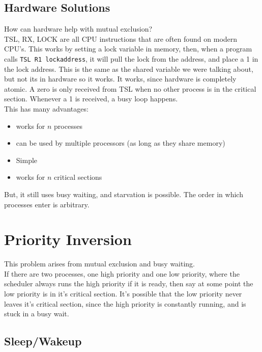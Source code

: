 \documentclass[12pt]{article}
\theoremstyle{definition}
\begin{document}
\subsection{Hardware Solutions}
How can hardware help with mutual exclusion?
\\ \linebreak
TSL, RX, LOCK are all CPU instructions that are often found on modern CPU's. This works by setting a lock variable in memory, then, when a program calls \texttt{TSL R1 lockaddress}, it will pull the lock from the address, and place a 1 in the lock address. This is the same as the shared variable we were talking about, but not its in hardware so it works. It works, since hardware is completely atomic. A zero is only received from TSL when no other process is in the critical section. Whenever a 1 is received, a busy loop happens.
\\ \linebreak
This has many advantages:
\begin{itemize}
	\item works for $n$ processes
	\item can be used by multiple processors (as long as they share memory)
	\item Simple
	\item works for $n$ critical sections
\end{itemize}
But, it still uses busy waiting, and starvation is possible. The order in which processes enter is arbitrary.
\\ \linebreak

\section{Priority Inversion}
This problem arises from mutual exclusion and busy waiting. 
\\ \linebreak
If there are two processes, one high priority and one low priority, where the scheduler always runs the high priority if it is ready, then say at some point the low priority is in it's critical section. It's possible that the low priority never leaves it's critical section, since the high priority is constantly running, and is stuck in a busy wait. 

\subsection{Sleep/Wakeup}
\end{document}
